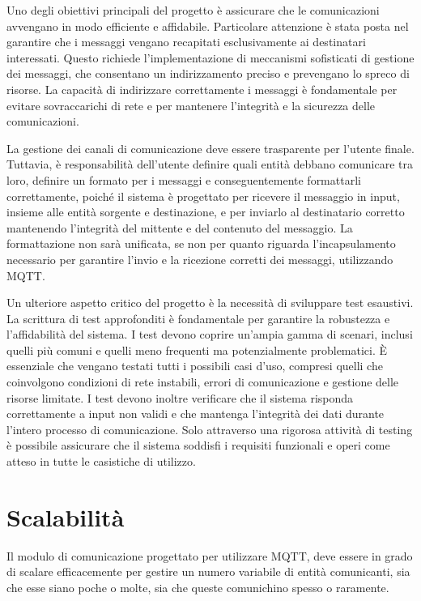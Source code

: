 \documentclass[12pt,a4paper,openright,twoside]{book}
\begin{document}
Uno degli obiettivi principali del progetto è assicurare che le comunicazioni avvengano in modo efficiente e affidabile. Particolare attenzione è stata posta nel garantire 
che i messaggi vengano recapitati esclusivamente ai destinatari interessati. Questo richiede l'implementazione di meccanismi sofisticati di gestione dei messaggi, 
che consentano un indirizzamento preciso e prevengano lo spreco di risorse. La capacità di indirizzare correttamente i messaggi è fondamentale per evitare sovraccarichi 
di rete e per mantenere l'integrità e la sicurezza delle comunicazioni.

La gestione dei canali di comunicazione deve essere trasparente per l'utente finale. Tuttavia, è responsabilità dell'utente definire quali entità debbano comunicare
tra loro, definire un formato per i messaggi e conseguentemente formattarli correttamente, poiché il sistema è progettato per ricevere il messaggio in input, 
insieme alle entità sorgente e destinazione, e per inviarlo al destinatario corretto mantenendo l'integrità del mittente e del contenuto del messaggio. 
La formattazione non sarà unificata, se non per quanto riguarda l'incapsulamento necessario per garantire l'invio e la ricezione corretti dei messaggi, utilizzando \ac{MQTT}.

Un ulteriore aspetto critico del progetto è la necessità di sviluppare test esaustivi. La scrittura di test approfonditi è fondamentale per garantire la robustezza 
e l'affidabilità del sistema. I test devono coprire un'ampia gamma di scenari, inclusi quelli più comuni e quelli meno frequenti ma potenzialmente problematici. 
È essenziale che vengano testati tutti i possibili casi d'uso, compresi quelli che coinvolgono condizioni di rete instabili, errori di comunicazione e gestione 
delle risorse limitate. I test devono inoltre verificare che il sistema risponda correttamente a input non validi e che mantenga l'integrità dei dati durante 
l'intero processo di comunicazione. Solo attraverso una rigorosa attività di testing è possibile assicurare che il sistema soddisfi i requisiti funzionali e 
operi come atteso in tutte le casistiche di utilizzo.

\section{Scalabilità}

Il modulo di comunicazione progettato per utilizzare \ac{MQTT}, deve essere in grado di scalare efficacemente per gestire un numero variabile 
di entità comunicanti, sia che esse siano poche o molte, sia che queste comunichino spesso o raramente.
\end{document}
